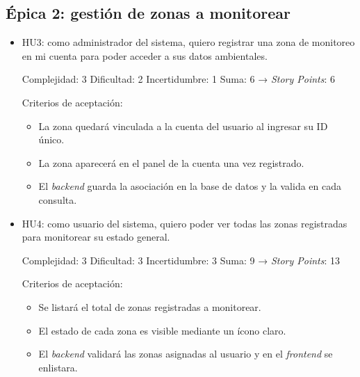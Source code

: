 \documentclass[
11pt, %
]{charter}
\begin{document}
\subsection*{Épica 2: gestión de zonas a monitorear}
\begin{itemize}
	\item HU3: como administrador del sistema, quiero registrar una zona de monitoreo en mi cuenta para poder acceder a sus datos ambientales.

	Complejidad: 3
	Dificultad: 2
	Incertidumbre: 1
	Suma: 6 → \textit{Story Points}: 6

	Criterios de aceptación:
	\begin{itemize}
		\item La zona quedará vinculada a la cuenta del usuario al ingresar su ID único.
		\item La zona aparecerá en el panel de la cuenta una vez registrado.
		\item El \textit{backend} guarda la asociación en la base de datos y la valida en cada consulta.
	\end{itemize}
	\item HU4: como usuario del sistema, quiero poder ver todas las zonas registradas para monitorear su estado general.

	Complejidad: 3
	Dificultad: 3
	Incertidumbre: 3
	Suma: 9 → \textit{Story Points}: 13

	Criterios de aceptación:
	\begin{itemize}
		\item Se listará el total de zonas registradas a monitorear.
		\item El estado de cada zona es visible mediante un ícono claro.
		\item El \textit{backend} validará las zonas asignadas al usuario y en el \textit{frontend} se enlistara.
	\end{itemize}
\end{itemize}
\end{document}
